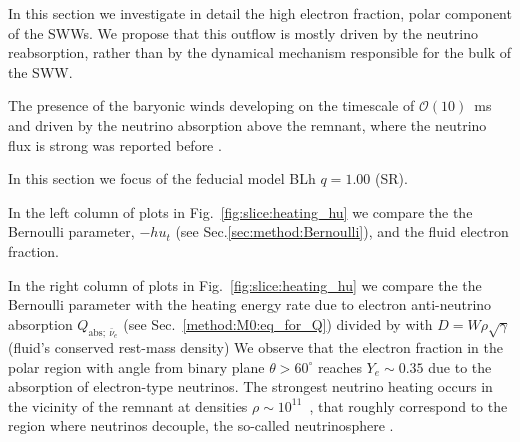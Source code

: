 In this section we investigate in detail the 
high electron fraction, polar component of the \acp{SWW}.
We propose that this outflow is mostly driven by the neutrino 
reabsorption, rather than by the dynamical mechanism responsible for the bulk of the 
\ac{SWW}.

The presence of the baryonic winds developing on the timescale of $\mathcal{O}(10)$~ms
and driven by the neutrino absorption above the remnant, where the neutrino flux is strong 
was reported before \citep[\eg][]{Perego:2014fma}. 

In this section we focus of the feducial model BLh $q=1.00$ (SR). 

In the left column of plots in Fig.~\ref{fig:slice:heating_hu} we compare 
the the Bernoulli parameter, 
$-hu_t$ (see Sec.\ref{sec:method:Bernoulli}), and the fluid electron 
fraction. 

In the right column of plots in Fig.~\ref{fig:slice:heating_hu} we compare 
the the Bernoulli parameter with the heating energy rate due to electron anti-neutrino absorption 
$Q_{\text{abs};\:\bar{\nu}_e}$ (see Sec.~\ref{method:M0:eq_for_Q}) divided by with 
$D=W\rho\sqrt{\gamma}$ (fluid's conserved rest-mass density)
We observe that the electron fraction in the polar region with angle 
from binary plane $\theta>60^{\circ}$ reaches $Y_e\sim0.35$ due to the absorption of 
electron-type neutrinos.
The strongest neutrino heating occurs in the vicinity of the remnant at densities 
$\rho\sim10^{11}$~\gcm, that roughly correspond to the region where neutrinos decouple,
the so-called neutrinosphere \citep{Endrizzi:2019trv}.

